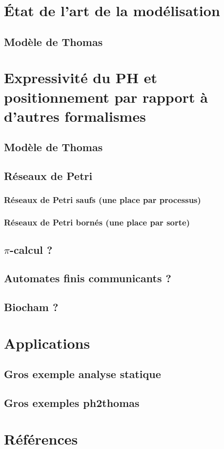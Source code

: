 \documentclass[a4paper]{report}
\begin{document}
\setcounter{tocdepth}{2}
\setcounter{secnumdepth}{3}
\tableofcontents






\chapter{État de l'art de la modélisation}
  \section{Modèle de Thomas}
  





\chapter{Expressivité du PH et positionnement par rapport à d'autres formalismes}
  \section{Modèle de Thomas}
  \section{Réseaux de Petri}
    \subsection{Réseaux de Petri saufs (une place par processus)}
    \subsection{Réseaux de Petri bornés (une place par sorte)}
  \section{$\pi$-calcul ?}
  \section{Automates finis communicants ?}
  \section{Biocham ?}

\chapter{Applications}
  \section{Gros exemple analyse statique}
  \section{Gros exemples ph2thomas}


  
\chapter*{Références}
%

\end{document}
